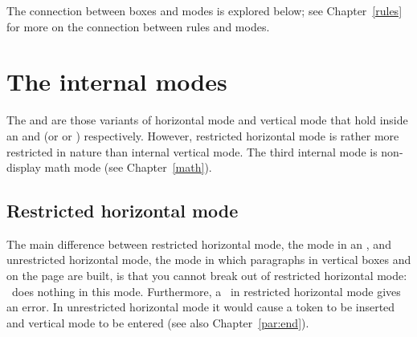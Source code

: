 \documentclass[twoside,letterpaper,openright]{rapport3}
\begin{document}
The connection between boxes and modes is explored below;
see Chapter~\ref{rules} for more on the connection between
rules and modes.

\section{The internal modes}

The  and 
are those variants of horizontal mode and vertical mode
that hold inside an  and  (or 
or ) respectively.
However, restricted horizontal mode is rather more
restricted in nature than internal vertical mode.
The third internal mode is non-display math mode
(see Chapter~\ref{math}).

\subsection{Restricted horizontal mode}

The main difference between restricted horizontal mode,
the mode in an , and unrestricted horizontal mode,
the mode in which paragraphs in vertical boxes
and on the page are built,
is that you cannot break out of restricted horizontal mode: 
~does nothing in this mode. 
Furthermore, a~ in restricted horizontal
mode gives an error. 
In unrestricted horizontal mode it would cause a
 token to be inserted and vertical mode to be entered
(see also Chapter~\ref{par:end}).
\end{document}
